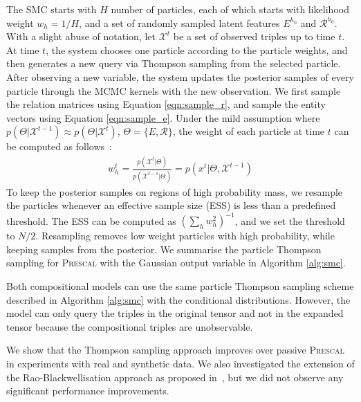 The SMC starts with $H$ number of particles, each of which starts with likelihood
weight $w_{h} = 1/H$, and a set of randomly sampled latent features $E^{h_0}$ and $\mathcal{R}^{h_0}$.
With a slight abuse of notation, let $\mathcal{X}^{t}$ be a set of observed triples up to time $t$.
At time $t$, the system chooses one particle according to the particle weights,
and then generates a new query via Thompson sampling from the selected particle.
After observing a new variable, the system updates the posterior samples of
every particle through the MCMC kernels with the new observation.
We first sample the relation matrices using Equation \ref{eqn:sample_r}, and sample the entity vectors using Equation \ref{eqn:sample_e}.
Under the mild assumption where
$p(\Theta | \mathcal{X}^{t-1}) \approx p(\Theta | \mathcal{X}^{t})$, $\Theta = \{E, \mathcal{R}\}$,
the weight of each particle at time $t$ can be computed as follows~\cite{del2006sequential}:
\begin{align}
w_{h}^{t} = \frac{p(\mathcal{X}^{t} | \Theta)}{p(\mathcal{X}^{t-1} | \Theta)}
 = p(x^{t} | \Theta, \mathcal{X}^{t-1})
\end{align}
To keep the posterior samples
on regions of high probability mass, we resample the particles whenever
an effective sample size (ESS) is less than a predefined threshold.
The ESS can be computed as $(\sum_h w_h^2)^{-1}$, and we set the threshold
to $N/2$. Resampling removes low weight particles with high probability,
while keeping samples from the posterior.
We summarise the particle Thompson sampling for \textsc{Prescal} with the
Gaussian output variable in Algorithm \ref{alg:smc}.

Both compositional models can use the same
particle Thompson sampling scheme described in Algorithm \ref{alg:smc} with the conditional distributions.
However, the model can only query the triples in the original tensor and
not in the expanded tensor because the compositional triples are unobservable.

We show that the Thompson sampling approach improves over passive \textsc{Prescal} in
experiments with real and synthetic data.
We also investigated the extension of the Rao-Blackwellisation approach as proposed
in~\cite{kawale2015efficient}, but we did not observe any significant performance improvements.

